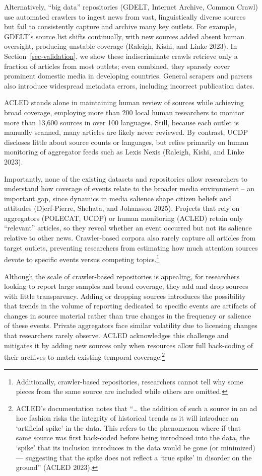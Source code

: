 \documentclass[
  letterpaper,
  DIV=11,
  numbers=noendperiod]{scrartcl}
\begin{document}
Alternatively, ``big data'' repositories (GDELT, Internet Archive,
Common Crawl) use automated crawlers to ingest news from vast,
linguistically diverse sources but fail to consistently capture and
archive many key outlets. For example, GDELT's source list shifts
continually, with new sources added absent human oversight, producing
unstable coverage (Raleigh, Kishi, and Linke 2023). In
Section~\ref{sec-validation}, we show these indiscriminate crawls
retrieve only a fraction of articles from most outlets; even combined,
they sparsely cover prominent domestic media in developing countries.
General scrapers and parsers also introduce widespread metadata errors,
including incorrect publication dates.

ACLED stands alone in maintaining human review of sources while
achieving broad coverage, employing more than 200 local human
researchers to monitor more than 13,600 sources in over 100 languages.
Still, because each outlet is manually scanned, many articles are likely
never reviewed. By contrast, UCDP discloses little about source counts
or languages, but relies primarily on human monitoring of aggregator
feeds such as Lexis Nexis (Raleigh, Kishi, and Linke 2023).

Importantly, none of the existing datasets and repositories allow
researchers to understand how coverage of events relate to the broader
media environment -- an important gap, since dynamics in media salience
shape citizen beliefs and attitudes (Djerf-Pierre, Shehata, and
Johansson 2025). Projects that rely on aggregators (POLECAT, UCDP) or
human monitoring (ACLED) retain only ``relevant'' articles, so they
reveal whether an event occurred but not its salience relative to other
news. Crawler-based corpora also rarely capture all articles from target
outlets, preventing researchers from estimating how much attention
sources devote to specific events versus competing topics.\footnote{Additionally,
  crawler-based repositories, researchers cannot tell why some pieces
  from the same source are included while others are omitted.}

Although the scale of crawler-based repositories is appealing, for
researchers looking to report large samples and broad coverage, they add
and drop sources with little transparency. Adding or dropping sources
introduces the possibility that trends in the volume of reporting
dedicated to specific events are artifacts of changes in source material
rather than true changes in the frequency or salience of these events.
Private aggregators face similar volatility due to licensing changes
that researchers rarely observe. ACLED acknowledges this challenge and
mitigates it by adding new sources only when resources allow full
back-coding of their archives to match existing temporal
coverage.\footnote{ACLED's documentation notes that ``\ldots{} the
  addition of such a source in an ad hoc fashion risks the integrity of
  historical trends as it will introduce an `artificial spike' in the
  data. This refers to the phenomenon where if that same source was
  first back-coded before being introduced into the data, the `spike'
  that its inclusion introduces in the data would be gone (or minimized)
  --- suggesting that the spike does not reflect a `true spike' in
  disorder on the ground'' (ACLED 2023).}
\end{document}
